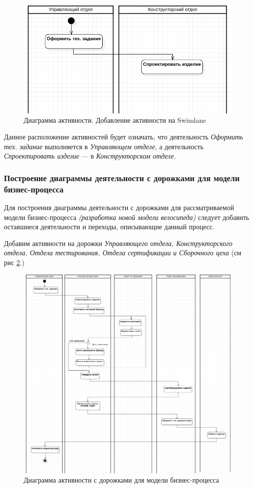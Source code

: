 \documentclass[a4paper,12pt]{report}
\begin{document}
\begin{figure}[h!]
	\centering
	\includegraphics[width=0.7\linewidth]{images/activityactivityonlane}
	\caption{Диаграмма активности. Добавление активности на Swimlane}
	\label{fig:activityactivityonlane}
\end{figure}


Данное расположение активностей будет означать, что деятельность \textit{Оформить тех. задание} выполняется в \textit{Управляющем отделе}, а деятельность \textit{Спроектировать изделие} --- в \textit{Конструкторском отделе.}
\subsubsection*{Построение диаграммы деятельности с дорожками для модели бизнес-процесса}
Для построения диаграммы деятельности с дорожками для рассматриваемой модели бизнес-процесса \textit{(разработка новой модели велосипеда)} следует добавить оставшиеся деятельности и переходы, описывающие данный процесс. 

Добавим активности на дорожки \textit{Управляющего отдела, Конструкторского отдела, Отдела тестирования, Отдела сертификации и Сборочного цеха} (см рис \ref{fig:activitydiagramswimlane}.)
\begin{figure}[h!]
	\centering
	\includegraphics[width=0.8\linewidth]{images/activitydiagramswimlane}
	\caption{Диаграмма активности с дорожками для модели бизнес-процесса}
	\label{fig:activitydiagramswimlane}
\end{figure}
\end{document}
